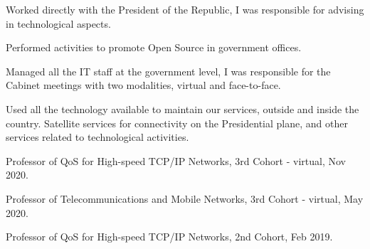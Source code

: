 \documentclass[]{plushcv}
\begin{document}
\begin{minipage}[t]{0.70\textwidth}
\begin{tightemize}
\sectionsep
\item Worked directly with the President of the Republic, I was responsible for advising in technological aspects.
\item Performed activities to promote Open Source in government offices.
\item Managed all the IT staff at the government level, I was responsible for the Cabinet meetings with two modalities, virtual and face-to-face.
\item Used all the technology available to maintain our services, outside and inside the country. Satellite services for connectivity on the Presidential plane, and other services related to technological activities.
\end{tightemize}
\sectionsep

\vspace{\topsep} %
\begin{tightemize}
	\sectionsep
	\item Professor of QoS for High-speed TCP/IP Networks, 3rd Cohort - virtual, Nov 2020.
	\item Professor of Telecommunications and Mobile Networks, 3rd Cohort - virtual, May 2020.
	\item Professor of QoS for High-speed TCP/IP Networks, 2nd Cohort, Feb 2019.
\end{tightemize}
\sectionsep


%
%

\end{minipage} 
\end{document}

